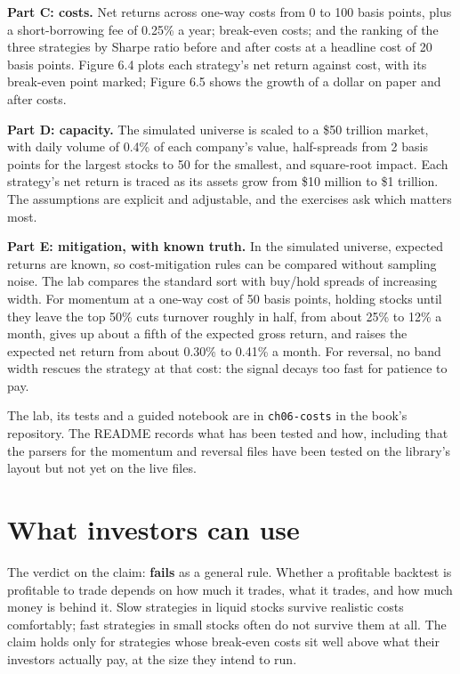 \textbf{Part C: costs.} Net returns across one-way costs from 0 to 100 basis points, plus a short-borrowing fee of 0.25\% a year; break-even costs; and the ranking of the three strategies by Sharpe ratio before and after costs at a headline cost of 20 basis points. Figure 6.4 plots each strategy's net return against cost, with its break-even point marked; Figure 6.5 shows the growth of a dollar on paper and after costs.

\textbf{Part D: capacity.} The simulated universe is scaled to a \$50 trillion market, with daily volume of 0.4\% of each company's value, half-spreads from 2 basis points for the largest stocks to 50 for the smallest, and square-root impact. Each strategy's net return is traced as its assets grow from \$10 million to \$1 trillion. The assumptions are explicit and adjustable, and the exercises ask which matters most.

\textbf{Part E: mitigation, with known truth.} In the simulated universe, expected returns are known, so cost-mitigation rules can be compared without sampling noise. The lab compares the standard sort with buy/hold spreads of increasing width. For momentum at a one-way cost of 50 basis points, holding stocks until they leave the top 50\% cuts turnover roughly in half, from about 25\% to 12\% a month, gives up about a fifth of the expected gross return, and raises the expected net return from about 0.30\% to 0.41\% a month. For reversal, no band width rescues the strategy at that cost: the signal decays too fast for patience to pay.

The lab, its tests and a guided notebook are in \texttt{ch06-costs} in the book's repository. The README records what has been tested and how, including that the parsers for the momentum and reversal files have been tested on the library's layout but not yet on the live files.

\section{What investors can use}
\label{sec:06-investors}

The verdict on the claim: \textbf{fails} as a general rule. Whether a profitable backtest is profitable to trade depends on how much it trades, what it trades, and how much money is behind it. Slow strategies in liquid stocks survive realistic costs comfortably; fast strategies in small stocks often do not survive them at all. The claim holds only for strategies whose break-even costs sit well above what their investors actually pay, at the size they intend to run.


